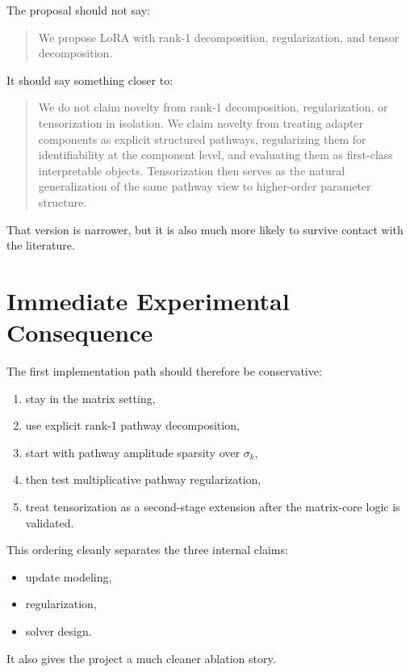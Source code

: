 \documentclass[11pt]{article}
\begin{document}
The proposal should not say:

\begin{quote}
We propose LoRA with rank-1 decomposition, regularization, and tensor decomposition.
\end{quote}

It should say something closer to:

\begin{quote}
We do not claim novelty from rank-1 decomposition, regularization, or tensorization in isolation. We claim novelty from treating adapter components as explicit structured pathways, regularizing them for identifiability at the component level, and evaluating them as first-class interpretable objects. Tensorization then serves as the natural generalization of the same pathway view to higher-order parameter structure.
\end{quote}

That version is narrower, but it is also much more likely to survive contact with the literature.

\section{Immediate Experimental Consequence}

The first implementation path should therefore be conservative:

\begin{enumerate}
\item stay in the matrix setting,
\item use explicit rank-1 pathway decomposition,
\item start with pathway amplitude sparsity over $\sigma_k$,
\item then test multiplicative pathway regularization,
\item treat tensorization as a second-stage extension after the matrix-core logic is validated.
\end{enumerate}

This ordering cleanly separates the three internal claims:

\begin{itemize}
\item update modeling,
\item regularization,
\item solver design.
\end{itemize}

It also gives the project a much cleaner ablation story.
\end{document}
